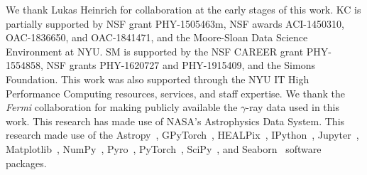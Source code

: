 \documentclass[]{article}
\begin{document}
\begin{ack}
 We thank Lukas Heinrich for collaboration at the early stages of this work. KC is partially supported by NSF grant PHY-1505463m, NSF awards ACI-1450310, OAC-1836650, and OAC-1841471, and the Moore-Sloan Data Science Environment at NYU. SM is supported by the NSF CAREER grant PHY-1554858, NSF grants PHY-1620727 and PHY-1915409, and the Simons Foundation. This work was also supported through the NYU IT High Performance Computing resources, services, and staff expertise. 
We thank the \emph{Fermi} collaboration for making publicly available the $\gamma$-ray data used in this work. This research has made use of NASA's Astrophysics Data System. This research made use of the Astropy~\cite{Robitaille:2013mpa,Price-Whelan:2018hus},
GPyTorch~\cite{gardner2018gpytorch},
HEALPix~\cite{Gorski:2004by,Zonca2019},
IPython~\cite{PER-GRA:2007},
Jupyter~\cite{Kluyver2016JupyterN},
Matplotlib~\cite{Hunter:2007},
NumPy~\cite{harris_array_2020},
Pyro~\cite{bingham2019pyro},
PyTorch~\cite{NEURIPS2019_9015},
SciPy~\cite{2020SciPy-NMeth}, and
Seaborn~\cite{michael_waskom_2017_883859}
software packages.
\end{ack}



\end{document}
